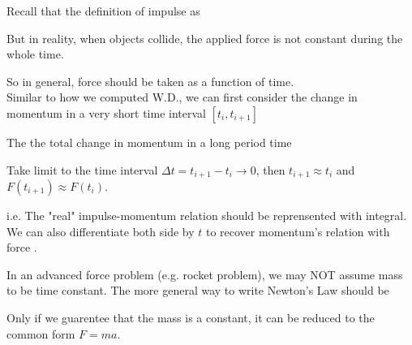 \documentclass[class=article, crop=false, 12pt]{standalone}
\begin{document}
Recall that the definition of impulse as


But in reality, when objects collide, the applied force is not constant during the whole time.


So in general, force should be taken as a function of time. \\

Similar to how we computed W.D., 
we can first consider the change in momentum in a very short time interval $[t_i, t_{i+1}]$

The the total change in momentum in a long period time 

Take limit to the time interval $\Delta t = t_{i+1}-t_i \to 0$, then $t_{i+1}\approx t_i$ and $F(t_{i+1})\approx F(t_i)$.

i.e. The "real" impulse-momentum relation should be reprensented with integral.
We can also differentiate both side by $t$ to recover momentum's relation with force . 

In an advanced force problem (e.g. rocket problem), we may NOT assume mass to be time constant. 
The more general way to write Newton's  Law should be 

Only if we guarentee that the mass is a constant, it can be reduced to the common form $F=ma$.

\theend
\end{document}
